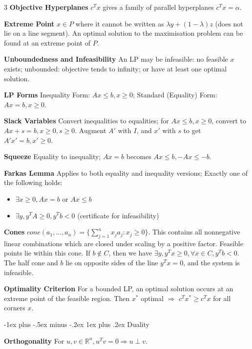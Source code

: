 \documentclass[10pt, landscape]{article}
\makeatletter
\renewcommand{\subsection}{\@startsection{subsection}{3}{0mm}%
                                {-1ex plus -.5ex minus -.2ex}%
                                {1ex plus .2ex}%
                                {\normalfont\small\bfseries}}%
\makeatother
\begin{document}
\begin{multicols*}{3}
\textbf{Objective Hyperplanes} $c^Tx$ gives a family of parallel hyperplanes $c^Tx=\alpha$.

\textbf{Extreme Point} $x \in P$ where it cannot be written as $\lambda y + (1-\lambda)z$ (does not lie on a line segment). An optimal solution to the maximisation problem can be found at an extreme point of $P$.

\textbf{Unboundedness and Infeasibility} An LP may be infeasible: no feasible $x$ exists; unbounded: objective tends to infinity; or have at least one optimal solution.

\textbf{LP Forms} Inequality Form: $Ax \leq b, x \geq 0$; Standard (Equality) Form: $Ax=b, x \geq 0$.

\textbf{Slack Variables} Convert inequalities to equalities; for $Ax \leq b, x \geq 0$, convert to $Ax+s=b, x \geq 0, s \geq 0$. Augment $A'$ with $I$, and $x'$ with $s$ to get $A'x'=b,x'\geq 0$.

\textbf{Squeeze} Equality to inequality; $Ax=b$ becomes $Ax \leq b, -Ax \leq -b$.

\textbf{Farkas Lemma} Applies to both equality and inequality versions; Exactly one of the following holds:
\begin{itemize}
    \item $\exists x \geq 0, Ax =b$ or $Ax \leq b$
    \item $\exists y, y^TA \geq 0, y^Tb < 0$ (certificate for infeasibility)
\end{itemize}


\textbf{Cones} $cone(a_1,...,a_n)=\{\sum_{j=1}^nx_ja_j: x_j \geq 0\}$. This contains all nonnegative linear combinations which are closed under scaling by a positive factor. Feasible points lie within this cone. If $b \notin C$, then we have $\exists y, y^Tx \geq 0, \forall x \in C, y^Tb < 0$. The half cone and $b$ lie on opposite sides of the line $y^Tx=0$, and the system is infeasible.

\textbf{Optimality Criterion} For a bounded LP, an optimal solution occurs at an extreme point of the feasible region. Then $x^*$ optimal $\Rightarrow$ $c^Tx^* \geq c^Tx$ for all corners $x$.

\subsection{Duality}

\textbf{Orthogonality} For $u,v \in \mathbb{R}^n, u^Tv=0 \Rightarrow u \perp v$.


\end{multicols*}
\end{document}
